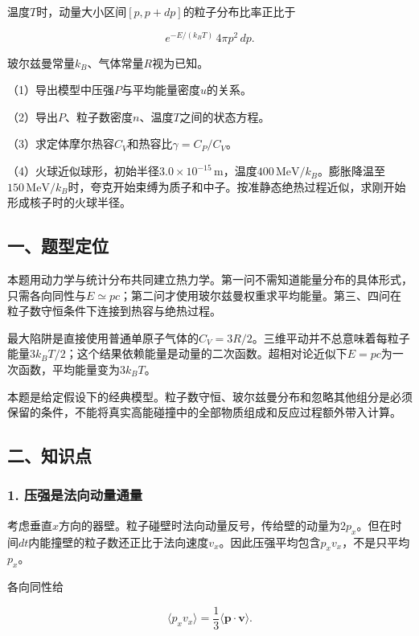 \documentclass[12pt,a4paper,fontset=fandol]{ctexart}
\begin{document}
温度\(T\)时，动量大小区间\([p,p+dp]\)的粒子分布比率正比于

\[
e^{-E/(k_BT)}\,4\pi p^2\,dp.
\]

玻尔兹曼常量\(k_B\)、气体常量\(R\)视为已知。

（1）导出模型中压强\(P\)与平均能量密度\(u\)的关系。

（2）导出\(P\)、粒子数密度\(n\)、温度\(T\)之间的状态方程。

（3）求定体摩尔热容\(C_V\)和热容比\(\gamma=C_P/C_V\)。

（4）火球近似球形，初始半径\(3.0\times10^{-15}\,\mathrm m\)，温度\(400\,\mathrm{MeV}/k_B\)。膨胀降温至\(150\,\mathrm{MeV}/k_B\)时，夸克开始束缚为质子和中子。按准静态绝热过程近似，求刚开始形成核子时的火球半径。

\subsection{一、题型定位}\label{ux4e00ux9898ux578bux5b9aux4f4d-6}

本题用动力学与统计分布共同建立热力学。第一问不需知道能量分布的具体形式，只需各向同性与\(E\simeq pc\)；第二问才使用玻尔兹曼权重求平均能量。第三、四问在粒子数守恒条件下连接到热容与绝热过程。

最大陷阱是直接使用普通单原子气体的\(C_V=3R/2\)。三维平动并不总意味着每粒子能量\(3k_BT/2\)；这个结果依赖能量是动量的二次函数。超相对论近似下\(E=pc\)为一次函数，平均能量变为\(3k_BT\)。

本题是给定假设下的经典模型。粒子数守恒、玻尔兹曼分布和忽略其他组分是必须保留的条件，不能将真实高能碰撞中的全部物质组成和反应过程额外带入计算。

\subsection{二、知识点}\label{ux4e8cux77e5ux8bc6ux70b9-6}

\subsubsection{1.
压强是法向动量通量}\label{ux538bux5f3aux662fux6cd5ux5411ux52a8ux91cfux901aux91cf}

考虑垂直\(x\)方向的器壁。粒子碰壁时法向动量反号，传给壁的动量为\(2p_x\)。但在时间\(dt\)内能撞壁的粒子数还正比于法向速度\(v_x\)。因此压强平均包含\(p_xv_x\)，不是只平均\(p_x\)。

各向同性给

\[
\langle p_xv_x\rangle
=\frac13\langle\boldsymbol p\cdot\boldsymbol v\rangle.
\]
\end{document}
